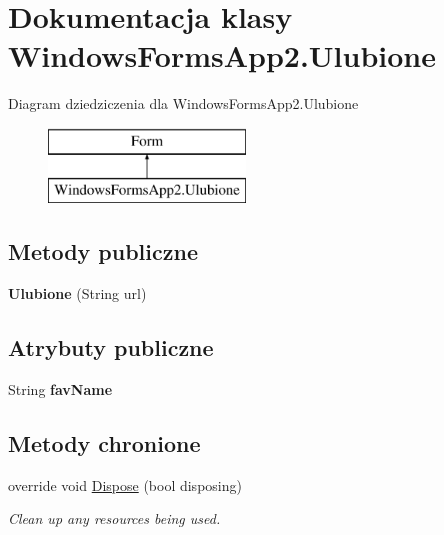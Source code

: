 \hypertarget{class_windows_forms_app2_1_1_ulubione}{}\section{Dokumentacja klasy Windows\+Forms\+App2.\+Ulubione}
\label{class_windows_forms_app2_1_1_ulubione}
Diagram dziedziczenia dla Windows\+Forms\+App2.\+Ulubione\begin{figure}[H]
\begin{center}
\leavevmode
\includegraphics[height=2.000000cm]{class_windows_forms_app2_1_1_ulubione}
\end{center}
\end{figure}
\subsection*{Metody publiczne}
\begin{DoxyCompactItemize}
\item 
\mbox{\label{class_windows_forms_app2_1_1_ulubione_a96147b868bb18d06532d4ccda7e61983}} 
{\bfseries Ulubione} (String url)
\end{DoxyCompactItemize}
\subsection*{Atrybuty publiczne}
\begin{DoxyCompactItemize}
\item 
\mbox{\label{class_windows_forms_app2_1_1_ulubione_a164751d342358e85dc72a22ae90ecc17}} 
String {\bfseries fav\+Name}
\end{DoxyCompactItemize}
\subsection*{Metody chronione}
\begin{DoxyCompactItemize}
\item 
override void \hyperlink{class_windows_forms_app2_1_1_ulubione_a114b27b249c5a38d47009008fbba7ecb}{Dispose} (bool disposing)
\begin{DoxyCompactList}\small\item\em Clean up any resources being used. \end{DoxyCompactList}\end{DoxyCompactItemize}
